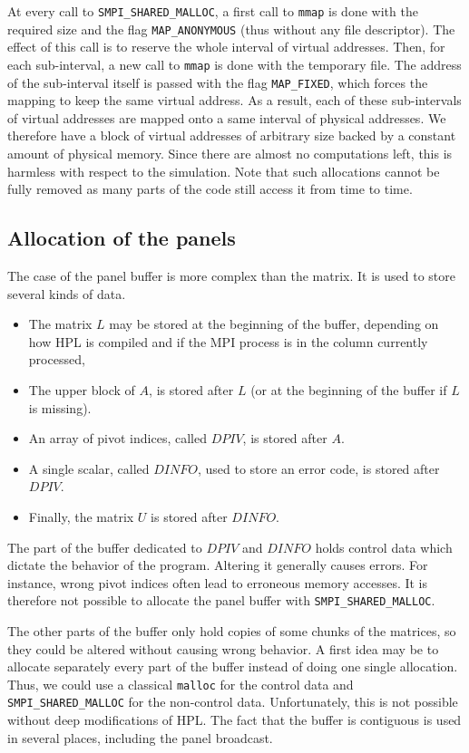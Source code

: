 \documentclass[12pt, a4paper]{memoir}
\begin{document}
At every call to \texttt{SMPI\_SHARED\_MALLOC}, a first call to \texttt{mmap} is done with the required size and the flag \texttt{MAP\_ANONYMOUS}
(thus without any file descriptor). The effect of this call is to reserve the whole interval of virtual
addresses. Then, for each sub-interval, a new call to \texttt{mmap} is done with the temporary file. The address of the
sub-interval itself is passed with the flag \texttt{MAP\_FIXED}, which forces the mapping to keep the same virtual address.
As a result, each of these sub-intervals of virtual addresses are mapped onto a same interval of physical
addresses. We therefore have a block of virtual addresses of arbitrary size backed by a constant amount of physical
memory. Since there are almost no computations left, this is harmless with respect to the simulation. Note that such
allocations cannot be fully removed as many parts of the code still access it from time to time.
\subsection{Allocation of the panels}
\label{sec:org4b37f21}
The case of the panel buffer is more complex than the matrix. It is used to store several kinds of data.
\begin{itemize}
\item The matrix \(L\) may be stored at the beginning of the buffer, depending on how HPL is compiled and if the MPI
process is in the column currently processed,
\item The upper block of \(A\), is stored after \(L\) (or at the beginning of the buffer if \(L\) is missing).
\item An array of pivot indices, called \(DPIV\), is stored after \(A\).
\item A single scalar, called \(DINFO\), used to store an error code, is stored after \(DPIV\).
\item Finally, the matrix \(U\) is stored after \(DINFO\).
\end{itemize}

The part of the buffer dedicated to \(DPIV\) and \(DINFO\) holds control data which dictate the behavior of the
program. Altering it generally causes errors. For instance, wrong pivot indices often lead to erroneous memory
accesses. It is therefore not possible to allocate the panel buffer with \texttt{SMPI\_SHARED\_MALLOC}.

The other parts of the buffer only hold copies of some chunks of the matrices, so they could be altered without
causing wrong behavior. A first idea may be to allocate separately every part of the buffer instead of doing one
single allocation. Thus, we could use a classical \texttt{malloc} for the control data and \texttt{SMPI\_SHARED\_MALLOC} for the
non-control data. Unfortunately, this is not possible without deep modifications of HPL. The fact that the
buffer is contiguous is used in several places, including the panel broadcast.
\end{document}
